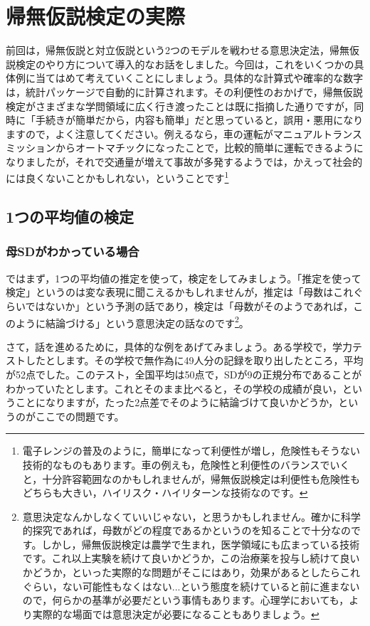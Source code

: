 \documentclass{ltjsarticle}
\begin{document}
\chapter{帰無仮説検定の実際}
\label{chapter18}
前回は，帰無仮説と対立仮説という2つのモデルを戦わせる意思決定法，帰無仮説検定のやり方について導入的なお話をしました。今回は，これをいくつかの具体例に当てはめて考えていくことにしましょう。具体的な計算式や確率的な数字は，統計パッケージで自動的に計算されます。その利便性のおかげで，帰無仮説検定がさまざまな学問領域に広く行き渡ったことは既に指摘した通りですが，同時に「手続きが簡単だから，内容も簡単」だと思っていると，誤用・悪用になりますので，よく注意してください。例えるなら，車の運転がマニュアルトランスミッションからオートマチックになったことで，比較的簡単に運転できるようになりましたが，それで交通量が増えて事故が多発するようでは，かえって社会的には良くないことかもしれない，ということです\footnote{電子レンジの普及のように，簡単になって利便性が増し，危険性もそうない技術的なものもあります。車の例えも，危険性と利便性のバランスでいくと，十分許容範囲なのかもしれませんが，帰無仮説検定は利便性も危険性もどちらも大きい，ハイリスク・ハイリターンな技術なのです。}
\section{1つの平均値の検定}
\subsection{母SDがわかっている場合}
ではまず，1つの平均値の推定を使って，検定をしてみましょう。「推定を使って検定」というのは変な表現に聞こえるかもしれませんが，推定は「母数はこれぐらいではないか」という予測の話であり，検定は「母数がそのようであれば，このように結論づける」という意思決定の話なのです\footnote{意思決定なんかしなくていいじゃない，と思うかもしれません。確かに科学的探究であれば，母数がどの程度であるかというのを知ることで十分なのです。しかし，帰無仮説検定は農学で生まれ，医学領域にも広まっている技術です。これ以上実験を続けて良いかどうか，この治療薬を投与し続けて良いかどうか，といった実際的な問題がそこにはあり，効果があるとしたらこれぐらい，ない可能性もなくはない...という態度を続けていると前に進まないので，何らかの基準が必要だという事情もあります。心理学においても，より実際的な場面では意思決定が必要になることもありましょう。}。

さて，話を進めるために，具体的な例をあげてみましょう。ある学校で，学力テストしたとします。その学校で無作為に49人分の記録を取り出したところ，平均が52点でした。このテスト，全国平均は50点で，SDが9の正規分布であることがわかっていたとします。これとそのまま比べると，その学校の成績が良い，ということになりますが，たった2点差でそのように結論づけて良いかどうか，というのがここでの問題です。
\end{document}

